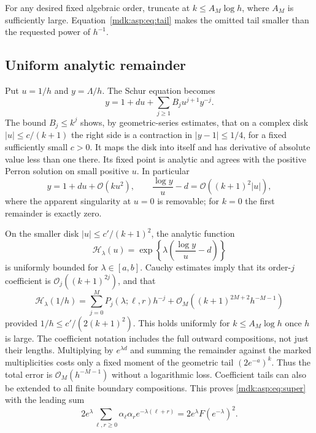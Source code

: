 \documentclass[11pt,letterpaper]{article}
\numberwithin{equation}{section}
\theoremstyle{remark}\newtheorem{remark}[theorem]{Remark}
\newcommand{\Oh}{\mathcal O}\newcommand{\Q}{\mathbb Q}\newcommand{\N}{\mathbb N}\newcommand{\R}{\mathbb R}
\begin{document}
For any desired fixed algebraic order, truncate at $k\le A_M\log h$, where $A_M$ is sufficiently large. Equation~\eqref{mdk:asp:eq:tail} makes the omitted tail smaller than the requested power of $h^{-1}$.

\subsection{Uniform analytic remainder}
Put $u=1/h$ and $y=\Lambda/h$. The Schur equation becomes
\begin{equation}\label{mdk:asp:eq:implicit}
y=1+du+\sum_{j\ge1}B_j u^{j+1}y^{-j}.
\end{equation}
The bound $B_j\le k^j$ shows, by geometric-series estimates, that on a complex disk $|u|\le c/(k+1)$ the right side is a contraction in $|y-1|\le1/4$, for a fixed sufficiently small $c>0$. It maps the disk into itself and has derivative of absolute value less than one there. Its fixed point is analytic and agrees with the positive Perron solution on small positive $u$. In particular
\[
y=1+du+\Oh(ku^2),\qquad \frac{\log y}{u}-d=\Oh((k+1)^2|u|),
\]
where the apparent singularity at $u=0$ is removable; for $k=0$ the first remainder is exactly zero.

On the smaller disk $|u|\le c'/(k+1)^2$, the analytic function
\[
\mathcal H_\lambda(u)=\exp\left\{\lambda\left(\frac{\log y}{u}-d\right)\right\}
\]
is uniformly bounded for $\lambda\in[a,b]$. Cauchy estimates imply that its order-$j$ coefficient is $\Oh_j((k+1)^{2j})$, and that
\begin{equation}\label{mdk:asp:eq:cauchy}
\mathcal H_\lambda(1/h)=\sum_{j=0}^M P_j(\lambda;\ell,r)h^{-j}
 +\Oh_M((k+1)^{2M+2}h^{-M-1})
\end{equation}
provided $1/h\le c'/(2(k+1)^2)$. This holds uniformly for $k\le A_M\log h$ once $h$ is large. The coefficient notation includes the full outward compositions, not just their lengths. Multiplying by $e^{\lambda d}$ and summing the remainder against the marked multiplicities costs only a fixed moment of the geometric tail $(2e^{-a})^k$. Thus the total error is $\Oh_M(h^{-M-1})$ without a logarithmic loss. Coefficient tails can also be extended to all finite boundary compositions. This proves \eqref{mdk:asp:eq:super} with the leading sum
\[
2e^\lambda\sum_{\ell,r\ge0}\alpha_\ell\alpha_r e^{-\lambda(\ell+r)}
=2e^\lambda F(e^{-\lambda})^2.
\]
\end{document}
